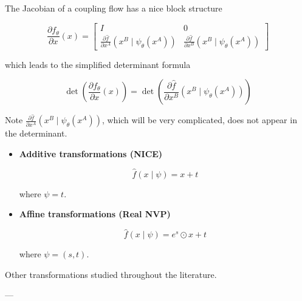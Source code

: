 \documentclass{report}
\begin{document}
\begin{concept}
    The Jacobian of a coupling flow has a nice block structure

    $$
    \frac{\partial f_{\theta}}{\partial x}(x)=\left[\begin{array}{cc}
    I & 0 \\
    \frac{\partial \hat{f}}{\partial x^{A}}\left(x^{B} \mid \psi_{\theta}\left(x^{A}\right)\right) & \frac{\partial \hat{f}}{\partial x^{B}}\left(x^{B} \mid \psi_{\theta}\left(x^{A}\right)\right)
    \end{array}\right]
    $$

    which leads to the simplified determinant formula

    $$
    \operatorname{det}\left(\frac{\partial f_{\theta}}{\partial x}(x)\right)=\operatorname{det}\left(\frac{\partial \hat{f}}{\partial x^{B}}\left(x^{B} \mid \psi_{\theta}\left(x^{A}\right)\right)\right)
    $$

    Note $\frac{\partial \hat{f}}{\partial x^{A}}\left(x^{B} \mid \psi_{\theta}\left(x^{A}\right)\right)$, which will be very complicated, does not appear in the determinant.
\end{concept}

\begin{definition}
    \begin{itemize}
        \item
        \textbf{Additive transformations (NICE)}

        $$
        \hat{f}(x \mid \psi)=x+t
        $$

        where $\psi=t$.
        \item
        \textbf{Affine transformations (Real NVP)}

        $$
        \hat{f}(x \mid \psi)=e^{s} \odot x+t
        $$

        where $\psi=(s, t)$.
    \end{itemize}

    Other transformations studied throughout the literature.
\end{definition}

--- 
\end{document}
